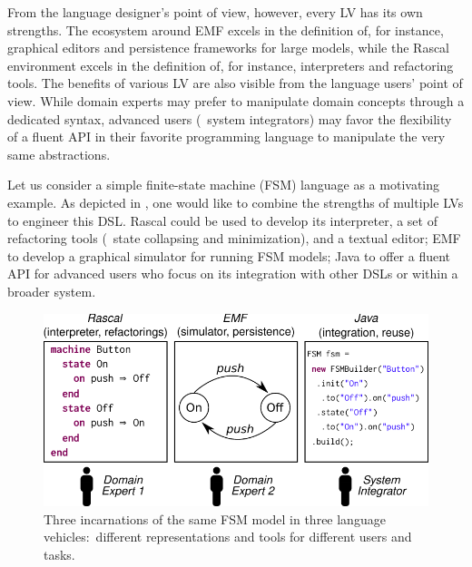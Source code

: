 From the language designer's point of view, however, every LV has its own strengths.
The ecosystem around EMF excels in the definition of, for instance, graphical editors and persistence frameworks for large models, while the Rascal environment excels in the definition of, for instance, interpreters and refactoring tools.
The benefits of various LV are also visible from the language users' point of view.
While domain experts may prefer to manipulate domain concepts through a dedicated syntax, advanced users (\eg~system integrators) may favor the flexibility of a fluent API in their favorite programming language to manipulate the very same abstractions.

Let us consider a simple finite-state machine (FSM) language as a motivating example.
As depicted in , one would like to combine the strengths of multiple LVs to engineer this DSL.
Rascal could be used to develop its interpreter, a set of refactoring tools (\eg~state collapsing and minimization), and a textual editor; EMF to develop a graphical simulator for running FSM models; Java to offer a fluent API for advanced users who focus on its integration with other DSLs or within a broader system.

\begin{figure}[bt]
	\centering
	\includegraphics[width=\columnwidth]{figures/motivating-fsm-simplified}
	\caption{Three incarnations of the same FSM model in three language vehicles:~different representations and tools for different users and tasks.}
	\label{fig:motivating-fsm}
\end{figure}

